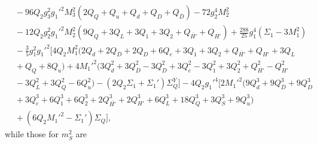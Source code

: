 \documentclass[preprint,amsmath,amssymb,aps,superscriptaddress,prd,showpacs,floatfix,nofootinbib]{revtex4-1}
\begin{document}
\begin{subequations}
\begin{align}
&{}-96Q_2g_3^2g_1'^2M_3^2\left ( 2Q_Q+Q_u+Q_d+Q_D+Q_{\overline{D}}\right )-72g_2^4M_2^2\nonumber\\
&{}-12Q_2g_2^2g_1'^2M_2^2\left ( 9Q_Q+3Q_L+3Q_1+3Q_2+Q_{\overline{H'}}+Q_{H'}\right )+\frac{288}{25}g_1^4\left ( \Sigma_1-3M_1^2\right )\nonumber\\
&{}-\frac{3}{5}g_1^2g_1'^2\Big [ 4Q_2M_1^2\big ( 2Q_d+2Q_{\overline{D}}+2Q_D+6Q_e+3Q_1+3Q_2+Q_{\overline{H'}}+Q_{H'}+3Q_L\nonumber\\
&{}+Q_Q+8Q_u\big )+4M_1'^2\big ( 3Q_d^2+3Q_{\overline{D}}^2-3Q_D^2+3Q_e^2-3Q_1^2+3Q_2^2+Q_{\overline{H'}}^2-Q_{H'}^2\nonumber\\
&{}-3Q_L^2+3Q_Q^2-6Q_u^2\big )-\left ( 2Q_2\Sigma_1+\Sigma_1'\right )\Sigma_Q^Y\Big ]-4Q_2g_1'^4\Big [ 2M_1'^2\big ( 9Q_d^3+9Q_{\overline{D}}^3+9Q_D^3\nonumber\\
&{}+3Q_e^3+6Q_1^3+6Q_2^3+2Q_{\overline{H'}}^3+2Q_{H'}^3+6Q_L^3+18Q_Q^3+3Q_S^3+9Q_u^3\big )\nonumber\\
&{}+\left ( 6Q_2M_1'^2-\Sigma_1'\right )\Sigma_Q\Big ],\label{eq:USSMmHu2Ot2Coeff}
\end{align}
\end{subequations}
while those for $m_S^2$ are
\end{document}
